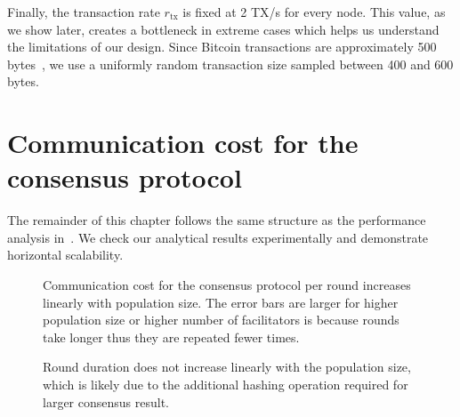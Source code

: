 Finally, the transaction rate $r_{\text{tx}}$ is fixed at 2 TX/s for every node.
This value, as we show later,
creates a bottleneck in extreme cases which helps us understand the limitations of our design.
Since Bitcoin transactions are approximately 500 bytes~\cite{txsize},
we use a uniformly random transaction size sampled between 400 and 600 bytes.


\section{Communication cost for the consensus protocol}
\label{sec:comms-cost-experiment}

The remainder of this chapter follows the same structure as the performance analysis in~.
We check our analytical results experimentally and demonstrate horizontal scalability.

\begin{figure}[tb]
  \centering
  \caption{Communication cost for the consensus protocol per round increases linearly with population size.
  The error bars are larger for higher population size or higher number of facilitators is because rounds take longer thus they are repeated fewer times.}
  \label{fig:round-comms}
\end{figure}

\begin{figure}[tb]
  \centering
  \caption{Round duration does not increase linearly with the population size,
  which is likely due to the additional hashing operation required for larger consensus result.}
  \label{fig:round-duration}
\end{figure}

